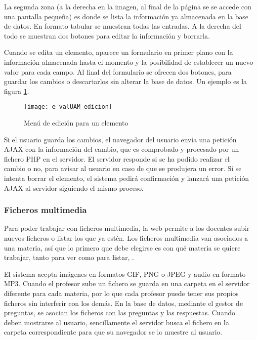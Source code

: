 La segunda zona (a la derecha en la imagen, al final de la página se se accede con una pantalla pequeña) es donde se lista la información ya almacenada en la base de datos. En formato tabular se muestran todas las entradas. A la derecha del todo se muestran dos botones para editar la información y borrarla.

Cuando se edita un elemento, aparece un formulario en primer plano con la información almacenada hasta el momento y la posibilidad de establecer un nuevo valor para cada campo. Al final del formulario se ofrecen dos botones, para guardar los cambios o descartarlos sin alterar la base de datos. Un ejemplo es la figura \ref{fig:e-valUAM edicion profesor}.

\begin{figure}[htp!]
	\centering
	\texttt{[image: e-valUAM\_edicion]}
	\caption{Menú de edición para un elemento}
	\label{fig:e-valUAM edicion profesor}
\end{figure}

Si el usuario guarda los cambios, el navegador del usuario envía una petición AJAX con la información del cambio, que es comprobado y procesado por un fichero PHP en el servidor. El servidor responde si se ha podido realizar el cambio o no, para avisar al usuario en caso de que se produjera un error. Si se intenta borrar el elemento, el sistema pedirá confirmación y lanzará una petición AJAX al servidor siguiendo el mismo proceso.

\subsubsection{Ficheros multimedia}

Para poder trabajar con ficheros multimedia, la web permite a los docentes subir nuevos ficheros o listar los que ya estén. Los ficheros multimedia van asociados a una materia, así que lo primero que debe elegirse es con qué materia se quiere trabajar, tanto para ver como para listar, .

El sistema acepta imágenes en formatos GIF, PNG o JPEG y audio en formato MP3. Cuando el profesor sube un fichero se guarda en una carpeta en el servidor diferente para cada materia, por lo que cada profesor puede tener sus propios ficheros sin interferir con los demás. En la base de datos, mediante el gestor de preguntas, se asocian los ficheros con las preguntas y las respuestas. Cuando deben mostrarse al usuario, sencillamente el servidor busca el fichero en la carpeta correspondiente para que su navegador se lo muestre al usuario.

